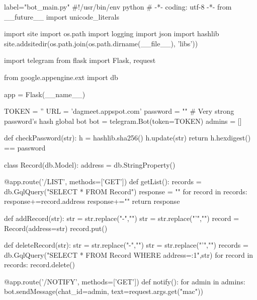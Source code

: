 \documentclass[a4paper,11pt]{article}
\begin{document}
\begin{pythoncode*}{label="bot\_main.py"}
#!/usr/bin/env python 
# -*- coding: utf-8 -*- 
from __future__ import unicode_literals 

import site 
import os.path 
import logging 
import json
import hashlib
site.addsitedir(os.path.join(os.path.dirname(__file__), 'libs')) 

import telegram 
from flask import Flask, request 

from google.appengine.ext import db




app = Flask(__name__) 

 
TOKEN = ''
URL = 'dagmeet.appspot.com' 
password = "" # Very strong password's hash
global bot 
bot = telegram.Bot(token=TOKEN) 
admins = []

def checkPassword(str):
    h = hashlib.sha256()
    h.update(str)
    return h.hexdigest() == password

class Record(db.Model):
    address = db.StringProperty()


@app.route('/LIST', methods=['GET']) 
def getList():
    records = db.GqlQuery("SELECT * FROM Record")
    response = ""
    for record in records:
        response+=record.address
        response+="\n"
    return response

def addRecord(str):
    str = str.replace("-","")
    str = str.replace("'","")
    record = Record(address=str)
    record.put()

def deleteRecord(str):
    str = str.replace("-","")
    str = str.replace("'","")
    records = db.GqlQuery("SELECT * FROM Record WHERE address=:1",str)
    for record in records:
        record.delete()




@app.route('/NOTIFY', methods=['GET']) 
def notify():
    for admin in admins:
        bot.sendMessage(chat_id=admin, text=request.args.get("mac"))


\end{pythoncode*}
\end{document}
